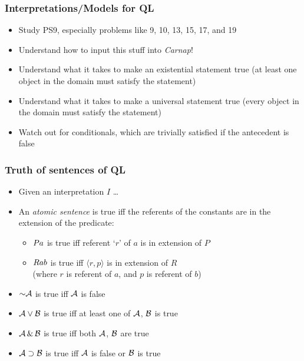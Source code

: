 \begin{frame}
\frametitle{Interpretations/Models for QL}

\begin{itemize}[<+->]

\item Study PS9, especially problems like 9, 10, 13, 15, 17, and 19

\item Understand how to input this stuff into \textit{Carnap}! 

\item Understand what it takes to make an existential statement true (at least one object in the domain must satisfy the statement)

\item Understand what it takes to make a universal statement true (every object in the domain must satisfy the statement)

\item Watch out for conditionals, which are trivially satisfied if the antecedent is false

\end{itemize}
\end{frame}

\begin{frame}
  \frametitle{Truth of sentences of QL}

  \begin{itemize}[<+->]
    \item Given an interpretation $I$ \dots
    \item An \emph{atomic sentence} is true iff the referents of the constants are in the extension of the predicate:
    \begin{itemize}
    \item $Pa$ is true iff referent `$r$' of $a$ is in extension of $P$
    \item $Rab$ is true iff $\langle r,p\rangle$ is in extension of $R$\\
    (where $r$ is referent of $a$, and $p$ is referent of $b$)
    \end{itemize}
    \item $\enot\metav{A}$ is true iff $\mathcal{A}$ is false
    \item $\mathcal{A} \vee \mathcal{B}$ is true iff at least one of $\mathcal{A}$, $\mathcal{B}$ is true
    \item $\mathcal{A} \,\&\, \mathcal{B}$ is true iff both $\mathcal{A}$, $\mathcal{B}$ are true
    \item $\mathcal{A} \supset \mathcal{B}$ is true iff $\mathcal{A}$ is false or $\mathcal{B}$ is true
  \end{itemize}
\end{frame}

